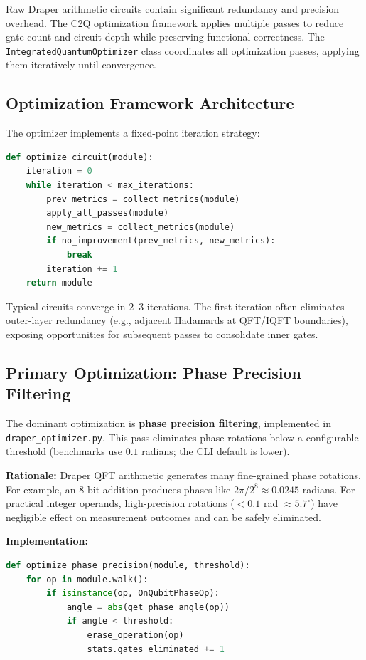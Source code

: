 \documentclass[a4paper,twocolumn]{article}
\begin{document}
Raw Draper arithmetic circuits contain significant redundancy and precision overhead. The C2Q
optimization framework applies multiple passes to reduce gate count and circuit depth while preserving
functional correctness. The \texttt{IntegratedQuantumOptimizer} class coordinates all optimization passes,
applying them iteratively until convergence.

\subsection{Optimization Framework Architecture}

The optimizer implements a fixed-point iteration strategy:

\begin{lstlisting}[language=Python, caption={Optimization Loop}]
def optimize_circuit(module):
    iteration = 0
    while iteration < max_iterations:
        prev_metrics = collect_metrics(module)
        apply_all_passes(module)
        new_metrics = collect_metrics(module)
        if no_improvement(prev_metrics, new_metrics):
            break
        iteration += 1
    return module
\end{lstlisting}

Typical circuits converge in 2--3 iterations. The first iteration often eliminates outer-layer redundancy
(e.g., adjacent Hadamards at QFT/IQFT boundaries), exposing opportunities for subsequent passes to consolidate inner gates.

\subsection{Primary Optimization: Phase Precision Filtering}

The dominant optimization is \textbf{phase precision filtering}, implemented in \texttt{draper\_optimizer.py}.
This pass eliminates phase rotations below a configurable threshold (benchmarks use $0.1$ radians; the CLI default is lower).

\textbf{Rationale:} Draper QFT arithmetic generates many fine-grained phase rotations. For example,
an 8-bit addition produces phases like $2\pi/2^8 \approx 0.0245$ radians. For practical integer operands,
high-precision rotations ($< 0.1$ rad $\approx 5.7^\circ$) have negligible effect on measurement outcomes
and can be safely eliminated.

\textbf{Implementation:}
\begin{lstlisting}[language=Python, caption={Phase Precision Filter}]
def optimize_phase_precision(module, threshold):
    for op in module.walk():
        if isinstance(op, OnQubitPhaseOp):
            angle = abs(get_phase_angle(op))
            if angle < threshold:
                erase_operation(op)
                stats.gates_eliminated += 1
\end{lstlisting}
\end{document}
